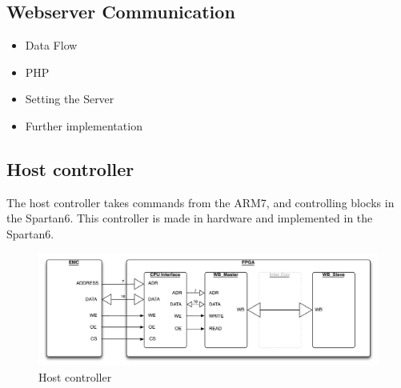 \subsection{Webserver Communication}
\begin{itemize}
	\item Data Flow
	\item PHP
	\item Setting the Server
	\item Further implementation
\end{itemize}


\subsection{Host controller}
The host controller takes commands from the ARM7, and controlling blocks in the Spartan6. This controller is made in hardware and implemented in the Spartan6.
\begin{figure}[H]
	\begin{centering}
		 \includegraphics[width=1.0\textwidth]{images/host_controller.pdf}
		\caption{Host controller}
	\end{centering}
\end{figure}
